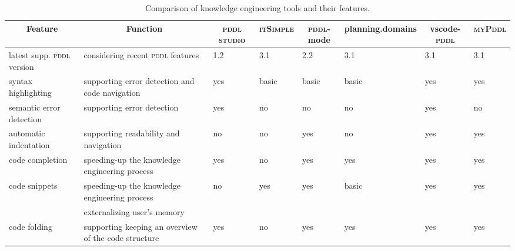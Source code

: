 \documentclass[runningheads]{llncs}
\newcommand{\tableheadline}[1]{\multicolumn{1}{c}{#1}}
\newcommand{\mypddl}{\textsc{myPddl}\xspace}
\newcommand{\pddlstudio}{\textsc{pddl studio}\xspace}
\newcommand{\itsimple}{\textsc{itSimple}\xspace}
\newcommand{\pddlmode}{\textsc{pddl}-mode\xspace}
\newcommand{\vscode}{vscode-\textsc{pddl}\xspace}
\newcommand{\pddl}{\textsc{pddl}\xspace}
\begin{document}
\begin{table}
\centering
\scriptsize
\caption[Comparison of knowledge engineeringtools]{\label{tool-comp}Comparison of knowledge engineering tools and their features.}
\begin{tabularx}{\textwidth}{lX|llllll}
  \tableheadline{Feature}             & \tableheadline{Function}                              & \tableheadline{\pddlstudio} & \tableheadline{\itsimple} & \tableheadline{\pddlmode} & \tableheadline{planning.domains} & \tableheadline{\vscode} & \tableheadline{\mypddl} \\
  \hline
  latest supp. \pddl version      & considering recent \pddl features                     & 1.2                         & 3.1                       & 2.2                           &   3.1    &  3.1    & 3.1       \\
  syntax highlighting                 & supporting error detection and code navigation        & yes                         & basic                     & basic                         &   basic  & yes     & yes       \\
  semantic error detection            & supporting error detection                            & yes                         & no                        & no                            &   no     & yes     & no        \\
  automatic indentation               & supporting readability and navigation                 & no                          & no                        & yes                           &   no     & yes     & yes       \\
  code completion                     & speeding-up the knowledge engineering process         & yes                         & no                        & yes                           &   yes    & yes     & yes       \\
  code snippets                       & speeding-up the knowledge engineering process         & no                          & yes                       & yes                           &   basic  & yes     & yes       \\
                                      & externalizing user's memory                           &                             &                           &                               &          &         &           \\
  code folding                        & supporting keeping an overview of the code structure  & yes                         & no                        & yes                           &   yes    & yes     & yes       \\

\end{tabularx}
\end{table}
\end{document}
